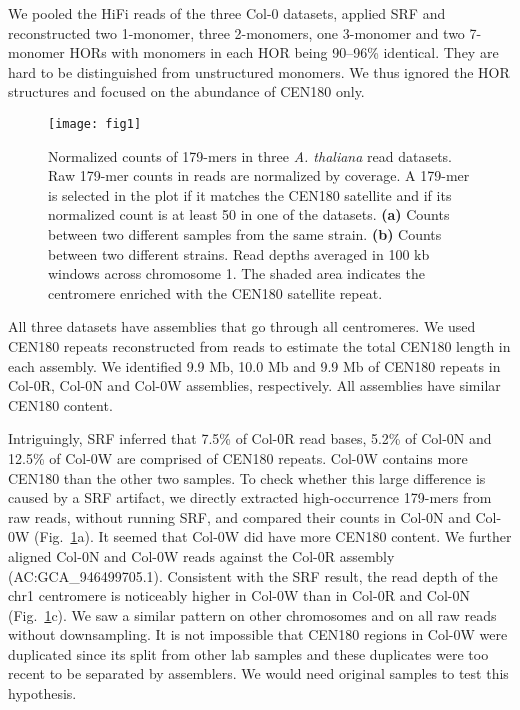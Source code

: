 \documentclass{bioinfo}
\newcommand{\revised}[1]{{\color{blue}#1}}
\begin{document}
\revised{We pooled the HiFi reads of the three Col-0 datasets, applied SRF and
reconstructed two 1-monomer, three 2-monomers, one 3-monomer and two 7-monomer
HORs with monomers in each HOR being 90--96\% identical. They are hard to be
distinguished from unstructured monomers.} We thus ignored the HOR structures
and focused on the abundance of CEN180 only.

\begin{figure}[!tb]
\texttt{[image: fig1]}
\caption{Normalized counts of 179-mers in three \emph{A. thaliana} read
datasets. Raw 179-mer counts in reads are normalized by coverage. A 179-mer is
selected in the plot if it matches the CEN180 satellite and if its normalized
count is at least 50 in one of the datasets. {\bf (a)} Counts between two
different samples from the same strain. {\bf (b)} Counts between two different
strains. \revised{{\bf (c)} Read depths averaged in 100 kb windows across
chromosome 1. The shaded area indicates the centromere enriched with the CEN180
satellite repeat.}}\label{fig:1}
\end{figure}

\revised{All three datasets have assemblies that go through all centromeres. We used
CEN180 repeats reconstructed from reads to estimate the total CEN180 length in
each assembly. We identified 9.9 Mb, 10.0 Mb and 9.9 Mb of CEN180 repeats in
Col-0R, Col-0N and Col-0W assemblies, respectively. All assemblies have similar
CEN180 content.

Intriguingly, SRF inferred that 7.5\% of Col-0R read bases, 5.2\% of Col-0N and
12.5\% of Col-0W are comprised of CEN180 repeats. Col-0W contains more CEN180
than the other two samples. To check whether this large difference is caused by
a SRF artifact, we directly extracted high-occurrence 179-mers from raw reads,
without running SRF, and compared their counts in Col-0N and Col-0W
(Fig.~\ref{fig:1}a). It seemed that Col-0W did have more CEN180 content. We
further aligned Col-0N and Col-0W reads against the Col-0R assembly
(AC:GCA\_946499705.1). Consistent with the SRF result, the read depth of the
chr1 centromere is noticeably higher in Col-0W than in Col-0R and Col-0N
(Fig.~\ref{fig:1}c). We saw a similar pattern on other chromosomes and on all
raw reads without downsampling. It is not impossible that CEN180 regions in
Col-0W were duplicated since its split from other lab samples and these
duplicates were too recent to be separated by assemblers. We would need
original samples to test this hypothesis.}
\end{document}

